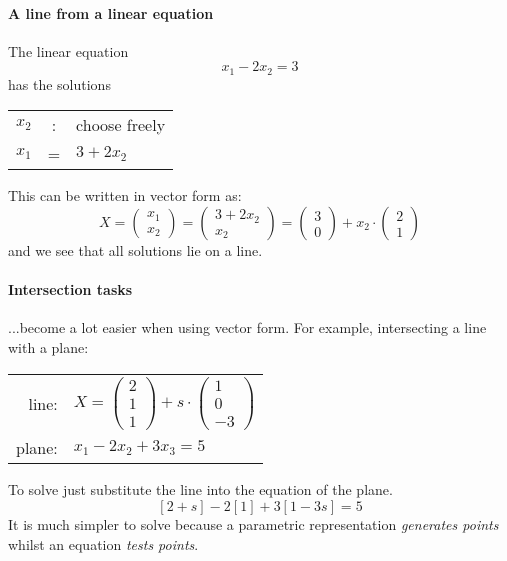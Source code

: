 \documentclass{article}
\begin{document}
\paragraph{A line from a linear equation}
The linear equation
$$x_1-2x_2=3$$
has the solutions
\begin{center}
\begin{tabular}{r c l}
$x_2$ & : & choose freely\\
$x_1$ & = & $3+2x_2$
\end{tabular}
\end{center}
This can be written in vector form as:
$$X=\begin{pmatrix}x_1 \\ x_2\end{pmatrix}
= \begin{pmatrix}3+2x_2 \\ x_2\end{pmatrix}
= \begin{pmatrix}3 \\ 0\end{pmatrix}
+ x_2\cdot \begin{pmatrix}2 \\ 1\end{pmatrix}$$
and we see that all solutions lie on a line.

\paragraph{Intersection tasks}
...become a lot easier when using vector form. For example, intersecting a line with a plane:
\begin{center}
\begin{tabular}{r l}
line: & $X=\begin{pmatrix}2\\1\\1\end{pmatrix}+s\cdot \begin{pmatrix}1\\0\\-3\end{pmatrix}$\\
plane: & $x_1-2x_2+3x_3=5$
\end{tabular}
\end{center}
To solve just substitute the line into the equation of the plane.
$$[2+s]-2[1]+3[1-3s]=5$$
It is much simpler to solve because a parametric representation \textit{generates points} whilst an equation \textit{tests points}.
\end{document}
